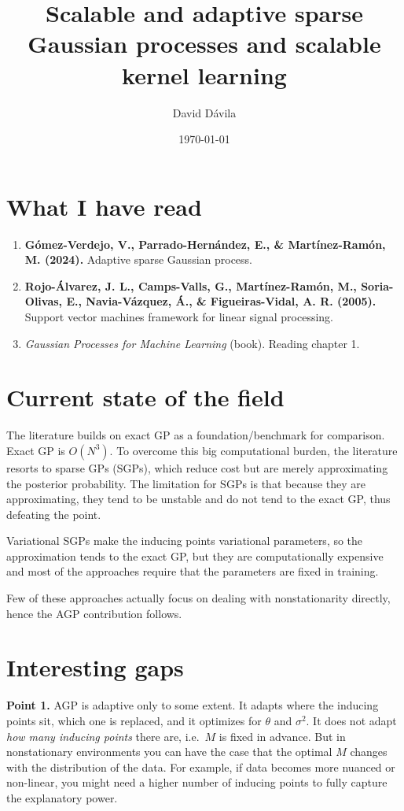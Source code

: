 \documentclass[11pt,a4paper]{article}
\title{\vspace{-2em}\large Scalable and adaptive sparse Gaussian processes and scalable kernel learning\vspace{-0.5em}}
\author{\normalsize David Dávila}
\date{\normalsize\today}
\begin{document}
\maketitle
\vspace{-1.5em}

\section*{What I have read}

\begin{enumerate}
  \item \textbf{Gómez-Verdejo, V., Parrado-Hernández, E., \& Martínez-Ramón, M. (2024).} Adaptive sparse Gaussian process.
  \item \textbf{Rojo-Álvarez, J. L., Camps-Valls, G., Martínez-Ramón, M., Soria-Olivas, E., Navia-Vázquez, Á., \& Figueiras-Vidal, A. R. (2005).} Support vector machines framework for linear signal processing.
  \item \emph{Gaussian Processes for Machine Learning} (book). Reading chapter 1.
\end{enumerate}

\section*{Current state of the field}

The literature builds on exact GP as a foundation/benchmark for comparison. Exact GP is $O(N^3)$. To overcome this big computational burden, the literature resorts to sparse GPs (SGPs), which reduce cost but are merely approximating the posterior probability. The limitation for SGPs is that because they are approximating, they tend to be unstable and do not tend to the exact GP, thus defeating the point.

Variational SGPs make the inducing points variational parameters, so the approximation tends to the exact GP, but they are computationally expensive and most of the approaches require that the parameters are fixed in training.

Few of these approaches actually focus on dealing with nonstationarity directly, hence the AGP contribution follows.

\section*{Interesting gaps}

\textbf{Point 1.} AGP is adaptive only to some extent. It adapts where the inducing points sit, which one is replaced, and it optimizes for $\theta$ and $\sigma^2$. It does not adapt \emph{how many inducing points} there are, i.e.\ $M$ is fixed in advance. But in nonstationary environments you can have the case that the optimal $M$ changes with the distribution of the data. For example, if data becomes more nuanced or non-linear, you might need a higher number of inducing points to fully capture the explanatory power.
\end{document}
